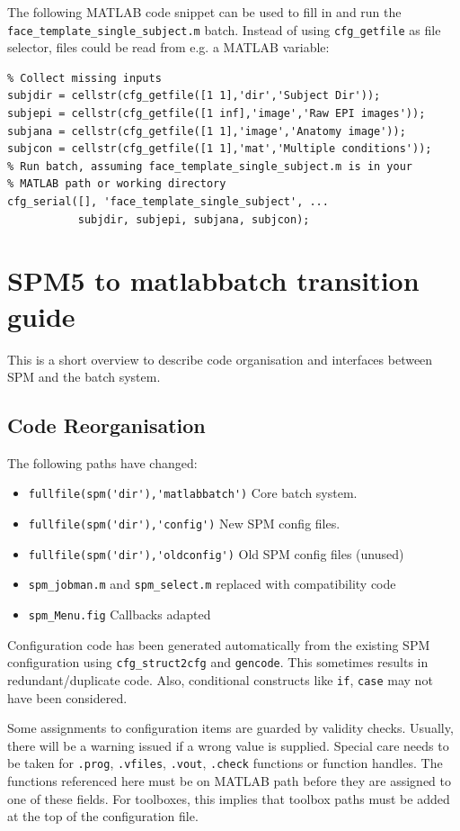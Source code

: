 The following MATLAB code snippet can be used to fill in and run the
\verb|face_template_single_subject.m| batch. Instead of using
\verb|cfg_getfile| as file selector, files could be read from e.g. a MATLAB
variable: 

\begin{verbatim}
% Collect missing inputs
subjdir = cellstr(cfg_getfile([1 1],'dir','Subject Dir'));
subjepi = cellstr(cfg_getfile([1 inf],'image','Raw EPI images'));
subjana = cellstr(cfg_getfile([1 1],'image','Anatomy image'));
subjcon = cellstr(cfg_getfile([1 1],'mat','Multiple conditions'));
% Run batch, assuming face_template_single_subject.m is in your 
% MATLAB path or working directory
cfg_serial([], 'face_template_single_subject', ...
           subjdir, subjepi, subjana, subjcon);
\end{verbatim}

\section{SPM5 to matlabbatch transition guide}
\label{sec:overview}

This is a short overview to describe code organisation and interfaces between
SPM and the batch system.

\subsection{Code Reorganisation}
\label{sec:overcode}

The following paths have changed:
\begin{itemize}
\item \verb|fullfile(spm('dir'),'matlabbatch')| Core batch system.
\item \verb|fullfile(spm('dir'),'config')| New SPM config files.
\item \verb|fullfile(spm('dir'),'oldconfig')| Old SPM config files (unused)
\item \verb|spm_jobman.m| and \verb|spm_select.m| replaced with compatibility
  code
\item \verb|spm_Menu.fig| Callbacks adapted
\end{itemize}

Configuration code has been generated automatically from the existing SPM
configuration using \verb|cfg_struct2cfg| and \verb|gencode|. This sometimes
results in redundant/duplicate code. Also, conditional constructs like
\verb|if|, \verb|case| may not have been considered. 

Some assignments to configuration items are guarded by validity
checks. Usually, there will be a warning issued if a wrong value is
supplied. Special care needs to be taken for \verb|.prog|, \verb|.vfiles|,
\verb|.vout|, \verb|.check| functions or function handles. The functions
referenced here must be on MATLAB path before they are assigned to one of
these fields. For toolboxes, this implies that toolbox paths must be added at
the top of the configuration file.


